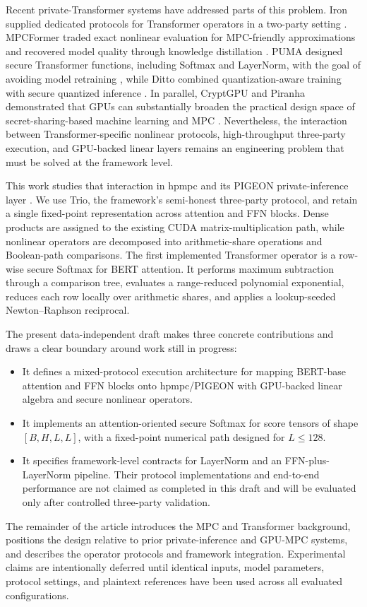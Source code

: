 Recent private-Transformer systems have addressed parts of this problem. Iron supplied dedicated protocols for Transformer operators in a two-party setting \cite{hao2022iron}. MPCFormer traded exact nonlinear evaluation for MPC-friendly approximations and recovered model quality through knowledge distillation \cite{li2023mpcformer}. PUMA designed secure Transformer functions, including Softmax and LayerNorm, with the goal of avoiding model retraining \cite{dong2023puma}, while Ditto combined quantization-aware training with secure quantized inference \cite{wu2024ditto}. In parallel, CryptGPU and Piranha demonstrated that GPUs can substantially broaden the practical design space of secret-sharing-based machine learning and MPC \cite{tan2021cryptgpu,watson2022piranha}. Nevertheless, the interaction between Transformer-specific nonlinear protocols, high-throughput three-party execution, and GPU-backed linear layers remains an engineering problem that must be solved at the framework level.

This work studies that interaction in hpmpc and its PIGEON private-inference layer \cite{harth2025hpmpc,harth2025pigeon}. We use Trio, the framework's semi-honest three-party protocol, and retain a single fixed-point representation across attention and FFN blocks. Dense products are assigned to the existing CUDA matrix-multiplication path, while nonlinear operators are decomposed into arithmetic-share operations and Boolean-path comparisons. The first implemented Transformer operator is a row-wise secure Softmax for BERT attention. It performs maximum subtraction through a comparison tree, evaluates a range-reduced polynomial exponential, reduces each row locally over arithmetic shares, and applies a lookup-seeded Newton--Raphson reciprocal.

The present data-independent draft makes three concrete contributions and draws a clear boundary around work still in progress:

\begin{itemize}
    \item It defines a mixed-protocol execution architecture for mapping BERT-base attention and FFN blocks onto hpmpc/PIGEON with GPU-backed linear algebra and secure nonlinear operators.
    \item It implements an attention-oriented secure Softmax for score tensors of shape $[B,H,L,L]$, with a fixed-point numerical path designed for $L\leq128$.
    \item It specifies framework-level contracts for LayerNorm and an FFN-plus-LayerNorm pipeline. Their protocol implementations and end-to-end performance are not claimed as completed in this draft and will be evaluated only after controlled three-party validation.
\end{itemize}

The remainder of the article introduces the MPC and Transformer background, positions the design relative to prior private-inference and GPU-MPC systems, and describes the operator protocols and framework integration. Experimental claims are intentionally deferred until identical inputs, model parameters, protocol settings, and plaintext references have been used across all evaluated configurations.
